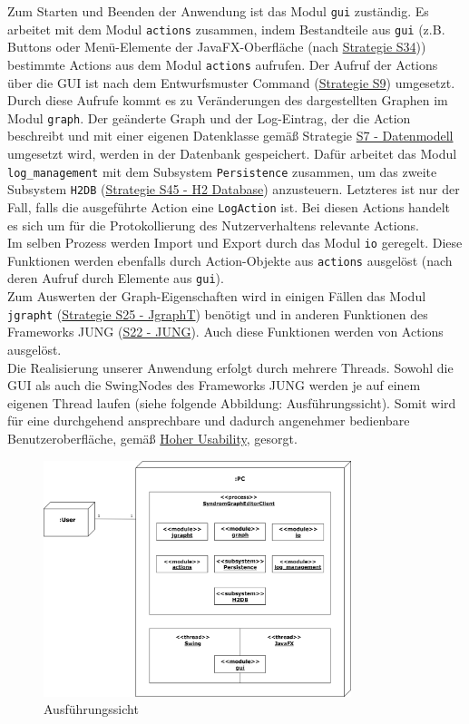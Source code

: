 \documentclass[enabledeprecatedfontcommands,fontsize=11pt,paper=a4,twoside]{scrartcl}
\newcounter{one}
\begin{document}
	Zum Starten und Beenden der Anwendung ist das Modul \texttt{gui} zuständig. Es arbeitet mit dem Modul \texttt{actions} zusammen, indem Bestandteile aus \texttt{gui} (z.B. Buttons oder Menü-Elemente der JavaFX-Oberfläche (nach \hyperlink{kkk}{Strategie S34})) bestimmte Actions aus dem Modul \texttt{actions} aufrufen. Der Aufruf der Actions über die GUI ist nach dem Entwurfsmuster Command (\hyperlink{command}{Strategie S9}) umgesetzt. Durch diese Aufrufe kommt es zu Veränderungen des dargestellten Graphen im Modul \texttt{graph}. Der geänderte Graph und der Log-Eintrag, der die Action beschreibt und mit einer eigenen Datenklasse gemäß Strategie \hyperlink{aaa}{S7 - Datenmodell} umgesetzt wird, werden in der Datenbank gespeichert. Dafür arbeitet das Modul \texttt{log\_management} mit dem Subsystem \texttt{Persistence} zusammen, um das zweite Subsystem \texttt{H2DB} (\hyperlink{ppp}{Strategie S45 - H2 Database}) anzusteuern. Letzteres ist nur der Fall, falls die ausgeführte Action eine \texttt{LogAction} ist. Bei diesen Actions handelt es sich um für die Protokollierung des Nutzerverhaltens relevante Actions.\\
	Im selben Prozess werden Import und Export durch das Modul \texttt{io} geregelt. Diese Funktionen werden ebenfalls durch Action-Objekte aus \texttt{actions} ausgelöst (nach deren Aufruf durch Elemente aus \texttt{gui}). \\
	Zum Auswerten der Graph-Eigenschaften wird in einigen Fällen das Modul \texttt{jgrapht} (\hyperlink{xxx}{Strategie S25 - JgraphT}) benötigt und in anderen Funktionen des Frameworks JUNG (\hyperlink{fff}{S22 - JUNG}). Auch diese Funktionen werden von Actions ausgelöst.\\
	
	Die Realisierung unserer Anwendung erfolgt durch mehrere Threads. Sowohl die GUI als auch die SwingNodes des Frameworks JUNG werden je auf einem eigenen Thread laufen (siehe folgende Abbildung: Ausführungssicht). Somit wird für eine durchgehend ansprechbare und dadurch angenehmer bedienbare Benutzeroberfläche, gemäß \hyperlink{g}{Hoher Usability}, gesorgt.\\
	
	
	\begin{figure}[ht]
		\begin{center}
			\includegraphics[width=0.8\textwidth]{Ausfuehrungssicht.png}
			\caption{Ausführungssicht}
		\end{center}
	\end{figure}
	\clearpage
	\newpage
	
\end{document}
